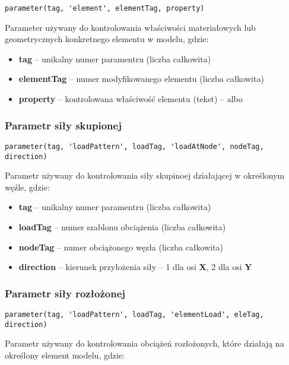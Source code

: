 \begin{lstlisting}
parameter(tag, 'element', elementTag, property)
\end{lstlisting}
Parameter używany do kontrolowania właściwości materiałowych lub geometrycznych konkretnego elementu w modelu, gdzie:

\begin{itemize}
    \item \textbf{tag} – unikalny numer paramentru (liczba całkowita)
    \item \textbf{elementTag} – numer modyfikowanego elementu (liczba całkowita)
    \item \textbf{property} – kontrolowana właściwość elementu (tekst) –  albo 
\end{itemize}

\subsubsection*{Parametr siły skupionej}

\begin{lstlisting}
parameter(tag, 'loadPattern', loadTag, 'loadAtNode', nodeTag, direction)
\end{lstlisting}
Parametr używany do kontrolowania siły skupinoej działającej w określonym węźle, gdzie:

\begin{itemize}
    \item \textbf{tag} – unikalny numer paramentru (liczba całkowita)
    \item \textbf{loadTag} – numer szablonu obciążenia (liczba całkowita)
    \item \textbf{nodeTag} – numer obciążonego węzła (liczba całkowita)
    \item \textbf{direction} – kierunek przyłożenia siły – 1 dla osi \textbf{X}, 2 dla osi \textbf{Y}
\end{itemize}

\subsubsection*{Parametr siły rozłożonej}

\begin{lstlisting}
parameter(tag, 'loadPattern', loadTag, 'elementLoad', eleTag, direction)
\end{lstlisting}
Parametr używany do kontrolowania obciążeń rozłożonych, które działają na określony element modelu, gdzie:

